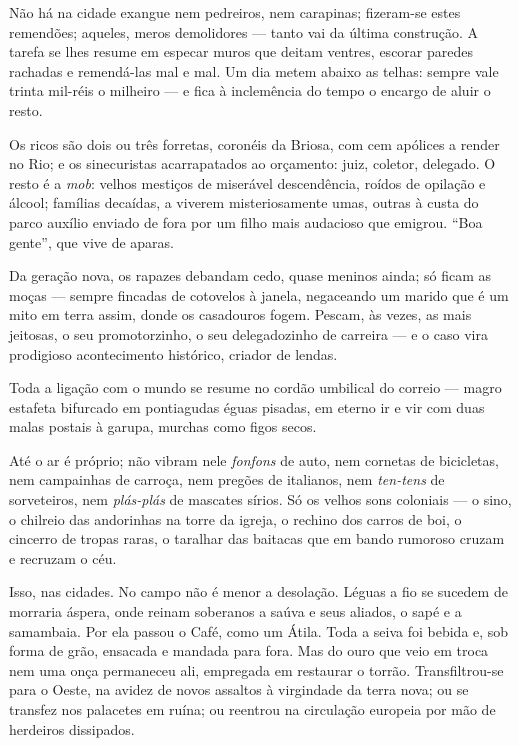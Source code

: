 Não há na cidade exangue nem pedreiros, nem carapinas; fizeram-se estes
remendões; aqueles, meros demolidores --- tanto vai da última
construção. A tarefa se lhes resume em especar muros que deitam ventres,
escorar paredes rachadas e remendá-las mal e mal. Um dia metem abaixo as
telhas: sempre vale trinta mil-réis o milheiro --- e fica à inclemência
do tempo o encargo de aluir o resto.

Os ricos são dois ou três forretas, coronéis da Briosa, com cem apólices
a render no Rio; e os sinecuristas acarrapatados ao orçamento: juiz,
coletor, delegado. O resto é a \emph{mob}: velhos mestiços de miserável
descendência, roídos de opilação e álcool; famílias decaídas, a viverem
misteriosamente umas, outras à custa do parco auxílio enviado de fora
por um filho mais audacioso que emigrou. ``Boa gente'', que vive de
aparas.

Da geração nova, os rapazes debandam cedo, quase meninos ainda; só ficam
as moças --- sempre fincadas de cotovelos à janela, negaceando um marido
que é um mito em terra assim, donde os casadouros fogem. Pescam, às
vezes, as mais jeitosas, o seu promotorzinho, o seu delegadozinho de
carreira --- e o caso vira prodigioso acontecimento histórico, criador
de lendas.

Toda a ligação com o mundo se resume no cordão umbilical do correio ---
magro estafeta bifurcado em pontiagudas éguas pisadas, em eterno ir e
vir com duas malas postais à garupa, murchas como figos secos.

Até o ar é próprio; não vibram nele \emph{fonfons} de auto, nem cornetas
de bicicletas, nem campainhas de carroça, nem pregões de italianos, nem
\emph{ten-tens} de sorveteiros, nem \emph{plás-plás} de mascates sírios.
Só os velhos sons coloniais --- o sino, o chilreio das andorinhas na
torre da igreja, o rechino dos carros de boi, o cincerro de tropas
raras, o taralhar das baitacas que em bando rumoroso cruzam e recruzam o
céu.

Isso, nas cidades. No campo não é menor a desolação. Léguas a fio se
sucedem de morraria áspera, onde reinam soberanos a saúva e seus
aliados, o sapé e a samambaia. Por ela passou o Café, como um Átila.
Toda a seiva foi bebida e, sob forma de grão, ensacada e mandada para
fora. Mas do ouro que veio em troca nem uma onça permaneceu ali,
empregada em restaurar o torrão. Transfiltrou-se para o Oeste, na avidez
de novos assaltos à virgindade da terra nova; ou se transfez nos
palacetes em ruína; ou reentrou na circulação europeia por mão de
herdeiros dissipados.

